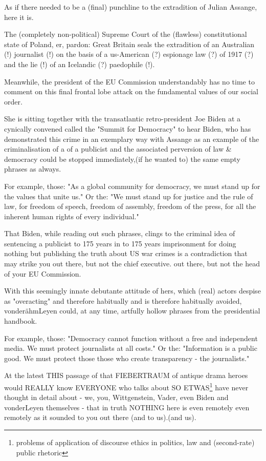 \begin{multicols}{2}
As if there needed to be a (final) punchline to the extradition of Julian Assange, here it is.

The (completely non-political) Supreme Court of the (flawless) constitutional state of Poland, er,
pardon: Great Britain seals the extradition of an Australian (!) journalist (!) on the basis of a
us-American (?) espionage law (?) of 1917 (?) and the lie (!) of an Icelandic (?) paedophile (!).

Meanwhile, the president of the EU Commission understandably has no time to comment on this final
frontal lobe attack on the fundamental values of our social order.

She is sitting together with the transatlantic retro-president Joe Biden at a cynically convened
called the "Summit for Democracy" to hear Biden, who has demonstrated this crime in an exemplary
way with Assange as an example of the criminalisation of a of a publicist and the associated
perversion of law \& democracy could be stopped immediately,(if he wanted to) the same empty
phrases as always.

For example, those: "As a global community for democracy, we must stand up for the values that unite
us." Or the: "We must stand up for justice and the rule of law, for freedom of speech, freedom of
assembly, freedom of the press, for all the inherent human rights of every individual."

That Biden, while reading out such phrases, clings to the criminal idea of sentencing a publicist to
175 years in to 175 years imprisonment for doing nothing but publishing the truth about US war
crimes is a contradiction that may strike you out there, but not the chief executive. out there,
but not the head of your EU Commission.

With this seemingly innate debutante attitude of hers, which (real) actors despise as "overacting"
and therefore habitually and is therefore habitually avoided, vonderähmLeyen could, at any time,
artfully hollow phrases from the presidential handbook.

For example, those: "Democracy cannot function without a free and independent media. We must protect
journalists at all costs." Or the: "Information is a public good. We must protect those those who
create transparency - the journalists."

At the latest THIS passage of that FIEBERTRAUM of antique drama heroes would REALLY know EVERYONE
who talks about SO ETWAS\footnote[37]{problems of application of discourse ethics in politics, law
and (second-rate) public rhetoric} have never thought in detail about
- we, you, Wittgenstein, Vader, even Biden and vonderLeyen themselves - that in truth NOTHING here
  is even remotely even remotely as it sounded to you out there (and to us).(and us).


\end{multicols}
